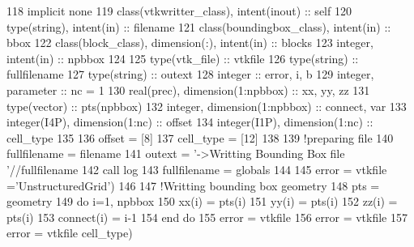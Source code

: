 \begin{DoxyCode}
118     \textcolor{keywordtype}{implicit none}
119     \textcolor{keywordtype}{class}(vtkwritter\_class), \textcolor{keywordtype}{intent(inout)} :: self
120     \textcolor{keywordtype}{type}(string), \textcolor{keywordtype}{intent(in)} :: filename
121     \textcolor{keywordtype}{class}(boundingbox\_class), \textcolor{keywordtype}{intent(in)} :: bbox
122     \textcolor{keywordtype}{class}(block\_class), \textcolor{keywordtype}{dimension(:)}, \textcolor{keywordtype}{intent(in)} :: blocks
123     \textcolor{keywordtype}{integer}, \textcolor{keywordtype}{intent(in)} :: npbbox
124 
125     \textcolor{keywordtype}{type}(vtk\_file) :: vtkfile
126     \textcolor{keywordtype}{type}(string) :: fullfilename
127     \textcolor{keywordtype}{type}(string) :: outext
128     \textcolor{keywordtype}{integer} :: error, i, b
129     \textcolor{keywordtype}{integer}, \textcolor{keywordtype}{parameter} :: nc = 1
130     \textcolor{keywordtype}{real(prec)}, \textcolor{keywordtype}{dimension(1:npbbox)} :: xx, yy, zz
131     \textcolor{keywordtype}{type}(vector) :: pts(npbbox)
132     \textcolor{keywordtype}{integer}, \textcolor{keywordtype}{dimension(1:npbbox)} :: connect, var
133     \textcolor{keywordtype}{integer(I4P)}, \textcolor{keywordtype}{dimension(1:nc)} :: offset
134     \textcolor{keywordtype}{integer(I1P)}, \textcolor{keywordtype}{dimension(1:nc)} :: cell\_type
135 
136     offset = [8]
137     cell\_type = [12]
138 
139     \textcolor{comment}{!preparing file}
140     fullfilename = filename%
141     outext = \textcolor{stringliteral}{'->Writting Bounding Box file '}//fullfilename
142     \textcolor{keyword}{call }log%
143     fullfilename = globals%
144 
145     error = vtkfile%
      =\textcolor{stringliteral}{'UnstructuredGrid'})
146 
147     \textcolor{comment}{!Writting bounding box geometry}
148     pts = geometry%
149     \textcolor{keywordflow}{do} i=1, npbbox
150         xx(i) = pts(i)%
151         yy(i) = pts(i)%
152         zz(i) = pts(i)%
153         connect(i) = i-1
154 \textcolor{keywordflow}{    end do}
155     error = vtkfile%
156     error = vtkfile%
157     error = vtkfile%
      cell\_type)

\end{DoxyCode}
